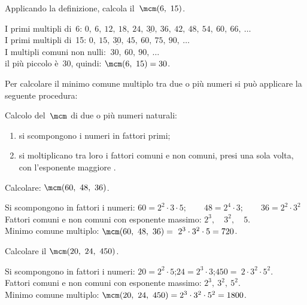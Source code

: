 \begin{esempio}{}{}
Applicando la definizione, calcola il~\(\mcm(6,~15)\).

I primi multipli di~6: \quad 
\(0,~6,~12,~18,~24,~\underline{30},~36,~42,~48,~54,~60,~66,~\dots\)\\
I primi multipli di~15: \quad 
\(0,~15,~\underline{30},~45,~60,~75,~90,~\dots\)\\
I multipli comuni non nulli: \quad \(~30,~60,~90,~\dots\)\\
il più piccolo è~30, quindi: \quad \(\mcm(6,~15) = 30\). 
\end{esempio}

Per calcolare il minimo comune multiplo tra due o più numeri si può 
applicare la seguente procedura:

\begin{procedura}{}{}
Calcolo del~\(\mcm\) di due o più numeri naturali:
\begin{enumerate}[noitemsep, label=(\alph*)]
 \item si scompongono i numeri in fattori primi;
 \item si moltiplicano tra loro i fattori comuni e non comuni, 
  presi una sola volta, con l'esponente maggiore .
\end{enumerate}
\end{procedura}

\begin{esempio}{}{}
Calcolare: \quad \(\mcm(60,~48,~36)\).

Si scompongono in fattori i numeri: \quad
\(60 = 2^2 \cdot 3 \cdot 5; 
  \qquad 48 = 2^4 \cdot 3; 
  \qquad 36 = 2^2 \cdot 3^2\)\\
Fattori comuni e non comuni con esponente massimo: 
\(2^3,\quad 3^2, \quad 5\).\\ 
Minimo comune multiplo: \quad 
\(\mcm(60,~48,~36)=~2^3 \cdot 3^2 \cdot 5 = 720\).
\end{esempio}

\begin{esempio}{}{}
Calcolare il \quad \(\mcm(20,~24,~450)\).

Si scompongono in fattori i numeri: \quad
\(20=2^2\cdot5\);\quad\(24=2^3\cdot3\);\quad\(450 =~2\cdot3^2\cdot5^2\).\\
Fattori comuni e non comuni con esponente massimo: 
\(2^3,~3^2,~5^ 2\).\\
Minimo comune multiplo: \quad 
\(\mcm(20,~24,~450) = 2^3 \cdot 3^2 \cdot 5^ 2 = 1800\).
\end{esempio}

